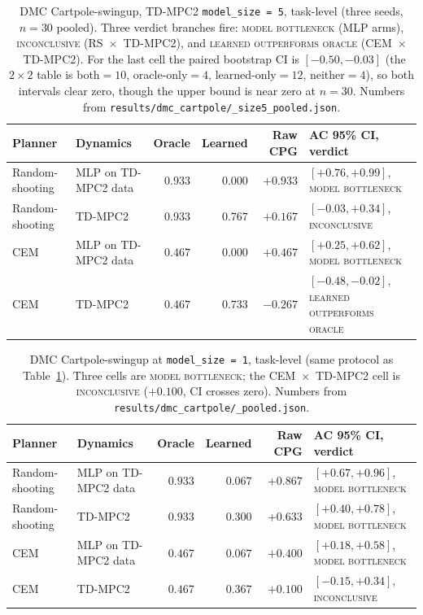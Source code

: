 \documentclass[10pt,letterpaper]{article}
\begin{document}
\begin{table}[t]
  \centering
  \small
  \begin{tabular}{llrrrl}
    \toprule
    Planner & Dynamics & Oracle & Learned & Raw CPG & AC 95\% CI, verdict \\
    \midrule
    Random-shooting & MLP on TD-MPC2 data & $0.933$ & $0.000$ & $+0.933$ & $[+0.76, +0.99]$, \textsc{model bottleneck} \\
    Random-shooting & TD-MPC2 & $0.933$ & $0.767$ & $+0.167$ & $[-0.03, +0.34]$, \textsc{inconclusive} \\
    CEM & MLP on TD-MPC2 data & $0.467$ & $0.000$ & $+0.467$ & $[+0.25, +0.62]$, \textsc{model bottleneck} \\
    CEM & TD-MPC2 & $0.467$ & $0.733$ & $-0.267$ & $[-0.48, -0.02]$, \textsc{learned outperforms oracle} \\
    \bottomrule
  \end{tabular}
  \caption{DMC Cartpole-swingup, TD-MPC2 \texttt{model\_size = 5}, task-level (three seeds, $n = 30$ pooled). Three verdict branches fire: \textsc{model bottleneck} (MLP arms), \textsc{inconclusive} (RS~$\times$~TD-MPC2), and \textsc{learned outperforms oracle} (CEM~$\times$~TD-MPC2). For the last cell the paired bootstrap CI is $[-0.50, -0.03]$ (the $2\times2$ table is both$=10$, oracle-only$=4$, learned-only$=12$, neither$=4$), so both intervals clear zero, though the upper bound is near zero at $n = 30$. Numbers from \texttt{results/dmc\_cartpole/\*\_size5\_pooled.json}.}
  \label{tab:crossenv}
\end{table}

\begin{table}[t]
  \centering
  \small
  \begin{tabular}{llrrrl}
    \toprule
    Planner & Dynamics & Oracle & Learned & Raw CPG & AC 95\% CI, verdict \\
    \midrule
    Random-shooting & MLP on TD-MPC2 data & $0.933$ & $0.067$ & $+0.867$ & $[+0.67, +0.96]$, \textsc{model bottleneck} \\
    Random-shooting & TD-MPC2 & $0.933$ & $0.300$ & $+0.633$ & $[+0.40, +0.78]$, \textsc{model bottleneck} \\
    CEM & MLP on TD-MPC2 data & $0.467$ & $0.067$ & $+0.400$ & $[+0.18, +0.58]$, \textsc{model bottleneck} \\
    CEM & TD-MPC2 & $0.467$ & $0.367$ & $+0.100$ & $[-0.15, +0.34]$, \textsc{inconclusive} \\
    \bottomrule
  \end{tabular}
  \caption{DMC Cartpole-swingup at \texttt{model\_size = 1}, task-level (same protocol as Table~\ref{tab:crossenv}). Three cells are \textsc{model bottleneck}; the CEM~$\times$~TD-MPC2 cell is \textsc{inconclusive} ($+0.100$, CI crosses zero). Numbers from \texttt{results/dmc\_cartpole/\*\_pooled.json}.}
  \label{tab:crossenv_size1}
\end{table}
\end{document}
